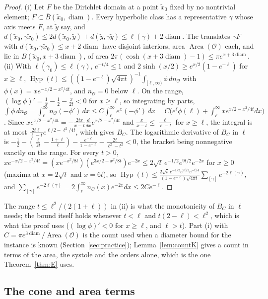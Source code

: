 \documentclass[pdflatex,sn-mathphys-num]{sn-jnl}
\theoremstyle{thmstyleone}%
\theoremstyle{thmstylethree}%
\newcommand{\Orb}{\mathcal{O}}
\newcommand{\Area}{\operatorname{Area}}
\newcommand{\Hyp}{\operatorname{Hyp}}
\newcommand{\diam}{\operatorname{diam}}
\begin{document}
\begin{proof}
(i) Let $F$ be the Dirichlet domain at a point $\tilde x_0$ fixed by no nontrivial element; $F\subset\bar B(\tilde x_0,\diam)$. Every hyperbolic class has a representative $\gamma$ whose axis meets $F$, at $\tilde y$ say, and $d(\tilde x_0,\gamma\tilde x_0)\le2d(\tilde x_0,\tilde y)+d(\tilde y,\gamma\tilde y)\le\ell(\gamma)+2\diam$. The translates $\gamma F$ with $d(\tilde x_0,\gamma\tilde x_0)\le x+2\diam$ have disjoint interiors, area $\Area(\Orb)$ each, and lie in $B(\tilde x_0,x+3\diam)$, of area $2\pi(\cosh(x+3\diam)-1)\le\pi e^{x+3\diam}$.
(ii) With $\ell(\gamma_0)\le\ell(\gamma)$, $e^{-t/4}\le1$ and $2\sinh(x/2)\ge e^{x/2}(1-e^{-\ell})$ for $x\ge\ell$, $\Hyp(t)\le((1-e^{-\ell})\sqrt{4\pi t})^{-1}\int_{[\ell,\infty)}\phi\,dn_\Orb$ with $\phi(x)=xe^{-x/2-x^2/4t}$, and $n_\Orb=0$ below $\ell$. On the range, $(\log\phi)'=\frac1x-\frac12-\frac x{2t}<0$ for $x\ge\ell$, so integrating by parts, $\int\phi\,dn_\Orb=\int_\ell^\infty n_\Orb(-\phi')\,dx\le C\int_\ell^\infty e^x(-\phi')\,dx=C\big(e^\ell\phi(\ell)+\int_\ell^\infty xe^{x/2-x^2/4t}dx\big)$. Since $xe^{x/2-x^2/4t}=-\frac{2tx}{x-t}\frac d{dx}e^{x/2-x^2/4t}$ and $\frac x{x-t}\le\frac\ell{\ell-t}$ for $x\ge\ell$, the integral is at most $\frac{2t\ell}{\ell-t}e^{\ell/2-\ell^2/4t}$, which gives $B_C$. The logarithmic derivative of $B_C$ in $\ell$ is $-\frac12-(\frac\ell{2t}-\frac{1+\ell}\ell)-\frac{e^{-\ell}}{1-e^{-\ell}}-\frac{2t}{\ell^2-t^2}<0$, the bracket being nonnegative exactly on the range. For every $t>0$, $xe^{-x/2-x^2/4t}=(xe^{-x^2/8t})(e^{3x/2-x^2/8t})e^{-2x}\le2\sqrt t\,e^{-1/2}e^{9t/2}e^{-2x}$ for $x\ge0$ (maxima at $x=2\sqrt t$ and $x=6t$), so $\Hyp(t)\le\frac{2\sqrt t\,e^{-1/2}e^{9t/2}e^{-t/4}}{(1-e^{-\ell})\sqrt{4\pi t}}\sum_{[\gamma]}e^{-2\ell(\gamma)}$, and $\sum_{[\gamma]}e^{-2\ell(\gamma)}=2\int_\ell^\infty n_\Orb(x)e^{-2x}dx\le2Ce^{-\ell}$.
\end{proof}

The range $t\le\ell^2/(2(1+\ell))$ in (ii) is what the monotonicity of $B_C$ in $\ell$ needs; the bound itself holds whenever $t<\ell$ and $t(2-\ell)<\ell^2$, which is what the proof uses ($(\log\phi)'<0$ for $x\ge\ell$, and $\ell>t$). Part (i) with $C=\pi e^{3\diam}/\Area(\Orb)$ is the count used when a diameter bound for the instance is known (Section~\ref{sec:practice}); Lemma~\ref{lem:countK} gives a count in terms of the area, the systole and the orders alone, which is the one Theorem~\ref{thm:E} uses.

\subsection{The cone and area terms}
\end{document}

